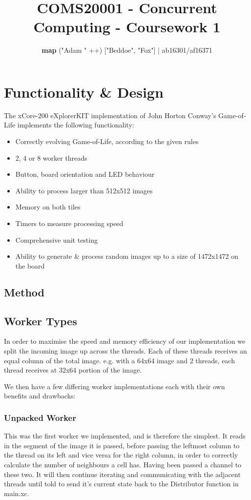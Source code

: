 \documentclass[11pt, oneside]{article}
\title{COMS20001 - Concurrent Computing - Coursework 1}
\author{\textbf{map} ("Adam " ++) ["Beddoe", "Fox"]   |  ab16301/af16371 }
\date{\vspace{-5mm}}
\begin{document}
\maketitle

\section{Functionality \& Design}
The xCore-200 eXplorerKIT implementation of John Horton Conway's Game-of-Life implements the following functionality:

\begin{itemize}
\setlength\itemsep{-2mm}
	\item Correctly evolving Game-of-Life, according to the given rules
	\item 2, 4 or 8 worker threads
	\item Button, board orientation and LED behaviour
	\item Ability to process larger than 512x512 images
	\item Memory on both tiles
	\item Timers to measure processing speed
	\item Comprehensive unit testing
	\item Ability to generate \& process random images up to a size of 1472x1472 on the board
\end{itemize}

\subsection{Method}


\vspace{-4mm}

\subsection{Worker Types}
\vspace{-2mm}
In order to maximise the speed and memory efficiency of our implementation we split the incoming image up across the threads. Each of these threads receives an equal column of the total image. e.g. with a 64x64 image and 2 threads, each thread receives at 32x64 portion of the image.

We then have a few differing worker implementations each with their own benefits and drawbacks:
\vspace{-8mm}

\subsubsection{Unpacked Worker}
This was the first worker we implemented, and is therefore the simplest. It reads in the segment of the image it is passed, before passing the leftmost column to the thread on its left and vice versa for the right column, in order to correctly calculate the number of neighbours a cell has. Having been passed a channel to these two. It will then continue iterating and communicating with the adjacent threads until told to send it's current state back to the Distributor function in main.xc.
\vspace{-2mm}
\end{document}
